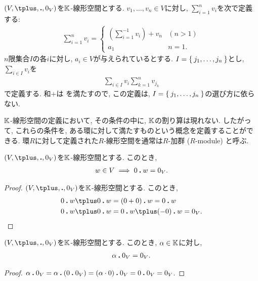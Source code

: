 \begin{remark}
$(V,\plus,\act,0_V)$を$\mathbb{K}$-線形空間とする.
$v_1,\ldots,v_n \in V$に対し,
$\sum_{i=1}^n v_i$を次で定義する:
\begin{align*}
\sum_{i=1}^n v_i
=
\begin{cases}
\left(\sum_{i=1}^{-1} v_i\right)\plus v_n& (n>1)\\
a_1&n=1.
\end{cases}
\end{align*}
$n$限集合$I$の各$i$に対し, $a_i\in V$が与えられているとする.
$I=\Set{j_1,\ldots,j_n}$とし,
$\sum_{i\in I} v_i$を
\begin{align*}
\sum_{i\in I} v_i
\sum_{k=1}^n v_{j_k}
\end{align*}
で定義する.
和$\plus$は
を満たすので,
この定義は,
$I=\Set{j_1,\ldots,j_n}$の選び方に依らない.
\end{remark}


\begin{remark}
  $\mathbb{K}$-線形空間の定義において,
  その条件の中に, $\mathbb{K}$の割り算は現れない.
  したがって,
  これらの条件を, ある環に対して満たすものという概念を定義することができる.
  環$R$に対して定義された$R$-線形空間を通常は$R$-加群 ($R$-module) と呼ぶ.
\end{remark}

\begin{prop}
  \label{prop:zeroveciszeroscalar}
  $(V,\plus ,\act ,0_V)$を$\mathbb{K}$-線形空間とする.
  このとき,
  \begin{align*}
    w\in V \implies 0\mathbin{\boldsymbol{.}} w=0_V. 
  \end{align*}
\end{prop}
\begin{proof}
$(V,\plus,\act,0_V)$を$\mathbb{K}$-線形空間とする.
  このとき,
  \begin{align*}
    0\act w\plus 0\act w&=(0+0)\act w=0\act w\\
    0\act w\plus 0\act w&=0\act w\plus (-0)\act w=0_V.
  \end{align*}
\end{proof}
\begin{prop}
$(V,\plus ,\act ,0_V)$を$\mathbb{K}$-線形空間とする.
このとき, $\alpha \in\mathbb{K}$に対し,
\begin{align*}
\alpha \mathbin{\boldsymbol{.}} 0_V = 0_V.
\end{align*}
\end{prop}
\begin{proof}
$\alpha \mathbin{\boldsymbol{.}} 0_V = \alpha \mathbin{\boldsymbol{.}} (0\mathbin{\boldsymbol{.}} 0_V)= (\alpha \cdot 0)\mathbin{\boldsymbol{.}} 0_V=0\mathbin{\boldsymbol{.}} 0_V=0_V$.
\end{proof}


